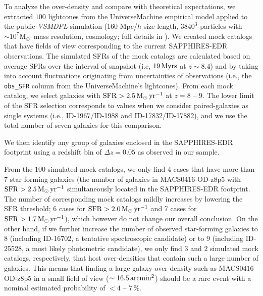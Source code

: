 \documentclass[twocolumn]{aastex631}
\def\msun{M$_{\odot}$}
\begin{document}
To analyze the over-density and compare with theoretical expectations, we extracted $100$ lightcones from the UniverseMachine empirical model \citep{Behroozi2019,Behroozi2020} applied to the public \textit{VSMDPL} simulation (160 Mpc/$h$ size length, $3840^3$ particles with $\sim 10^7$\msun\ mass resolution, \citealt{Planck2016} cosmology; full details in \citealt{Klypin16,RP16}).  We created mock catalogs that have fields of view corresponding to the current SAPPHIRES-EDR observations. The simulated SFRs of the mock catalogs are calculated based on average SFRs over the interval of snapshot (i.e, $19\,{\rm Myrs}$ at $z\sim8.4$) and by taking into account fluctuations originating from uncertainties of observations (i.e., the \texttt{obs\_SFR} column from the UniverseMachine's lightcones).
From each mock catalog, we select galaxies with ${\rm SFR>2.5\,{\rm M_{\odot}\,yr^{-1}}}$ at $z=8$ -- $9$.
The lower limit of the SFR selection corresponds to values when we consider paired-galaxies as single systems (i.e., ID-1967/ID-1988 and ID-17832/ID-17882), and we use the total number of seven galaxies for this comparison.

We then identify any group of galaxies enclosed in the SAPPHIRES-EDR footprint using a redshift bin of $\Delta z=0.05$ as observed in our sample.

From the $100$ simulated mock catalogs, we only find $4$ cases that have more than $7$ star forming galaxies (the number of galaxies in MACS0416-OD-z8p5 with ${\rm SFR > 2.5\,{\rm M_{\odot}\,yr^{-1}}}$ simultaneously located in the SAPPHIRES-EDR footprint. The number of corresponding mock catalogs mildly increases by lowering the SFR threshold; 6 cases for ${\rm SFR > 2.0\,{\rm M_{\odot}\,yr^{-1}}}$ and 7 cases for ${\rm SFR > 1.7\,{\rm M_{\odot}\,yr^{-1}}}$), which however do not change our overall conclusion.
On the other hand, if we further increase the number of observed star-forming galaxies to $8$ (including ID-16702, a tentative spectroscopic candidate) or to $9$ (including ID-25528, a most likely photometric candidate), we only find $3$ and $2$ simulated mock catalogs, respectively, that host over-densities that contain such a large number of galaxies. This means that finding a large galaxy over-density such as MACS0416-OD-z8p5 in a small field of view ($\sim16.5\,{\rm arcmin^2}$) should be a rare event with a nominal estimated probability of $<4$ -- $7\,\%$.
\end{document}

